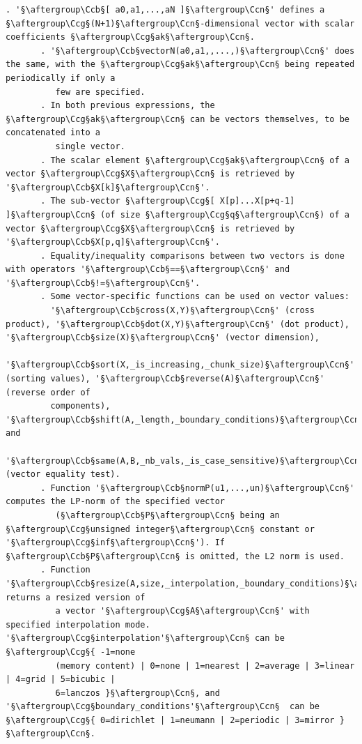 \documentclass[a4paper,10.5pt,twoside]{book}
\def\Ccb{\color{cb}}
\def\Ccg{\color{cc}}
\def\Ccn{\color{black}}
\begin{document}
\begin{lstlisting}[escapechar=§]
       . '§\aftergroup\Ccb§[ a0,a1,...,aN ]§\aftergroup\Ccn§' defines a §\aftergroup\Ccg§(N+1)§\aftergroup\Ccn§-dimensional vector with scalar coefficients §\aftergroup\Ccg§ak§\aftergroup\Ccn§. 
       . '§\aftergroup\Ccb§vectorN(a0,a1,,...,)§\aftergroup\Ccn§' does the same, with the §\aftergroup\Ccg§ak§\aftergroup\Ccn§ being repeated periodically if only a 
          few are specified. 
       . In both previous expressions, the §\aftergroup\Ccg§ak§\aftergroup\Ccn§ can be vectors themselves, to be concatenated into a 
          single vector. 
       . The scalar element §\aftergroup\Ccg§ak§\aftergroup\Ccn§ of a vector §\aftergroup\Ccg§X§\aftergroup\Ccn§ is retrieved by '§\aftergroup\Ccb§X[k]§\aftergroup\Ccn§'. 
       . The sub-vector §\aftergroup\Ccg§[ X[p]...X[p+q-1] ]§\aftergroup\Ccn§ (of size §\aftergroup\Ccg§q§\aftergroup\Ccn§) of a vector §\aftergroup\Ccg§X§\aftergroup\Ccn§ is retrieved by '§\aftergroup\Ccb§X[p,q]§\aftergroup\Ccn§'. 
       . Equality/inequality comparisons between two vectors is done with operators '§\aftergroup\Ccb§==§\aftergroup\Ccn§' and '§\aftergroup\Ccb§!=§\aftergroup\Ccn§'. 
       . Some vector-specific functions can be used on vector values: 
         '§\aftergroup\Ccb§cross(X,Y)§\aftergroup\Ccn§' (cross product), '§\aftergroup\Ccb§dot(X,Y)§\aftergroup\Ccn§' (dot product), '§\aftergroup\Ccb§size(X)§\aftergroup\Ccn§' (vector dimension), 
         '§\aftergroup\Ccb§sort(X,_is_increasing,_chunk_size)§\aftergroup\Ccn§' (sorting values), '§\aftergroup\Ccb§reverse(A)§\aftergroup\Ccn§' (reverse order of 
         components), '§\aftergroup\Ccb§shift(A,_length,_boundary_conditions)§\aftergroup\Ccn§' and 
         '§\aftergroup\Ccb§same(A,B,_nb_vals,_is_case_sensitive)§\aftergroup\Ccn§' (vector equality test). 
       . Function '§\aftergroup\Ccb§normP(u1,...,un)§\aftergroup\Ccn§' computes the LP-norm of the specified vector 
          (§\aftergroup\Ccb§P§\aftergroup\Ccn§ being an §\aftergroup\Ccg§unsigned integer§\aftergroup\Ccn§ constant or '§\aftergroup\Ccg§inf§\aftergroup\Ccn§'). If §\aftergroup\Ccb§P§\aftergroup\Ccn§ is omitted, the L2 norm is used. 
       . Function '§\aftergroup\Ccb§resize(A,size,_interpolation,_boundary_conditions)§\aftergroup\Ccn§' returns a resized version of 
          a vector '§\aftergroup\Ccg§A§\aftergroup\Ccn§' with specified interpolation mode. '§\aftergroup\Ccg§interpolation'§\aftergroup\Ccn§ can be §\aftergroup\Ccg§{ -1=none 
          (memory content) | 0=none | 1=nearest | 2=average | 3=linear | 4=grid | 5=bicubic | 
          6=lanczos }§\aftergroup\Ccn§, and '§\aftergroup\Ccg§boundary_conditions'§\aftergroup\Ccn§  can be §\aftergroup\Ccg§{ 0=dirichlet | 1=neumann | 2=periodic | 3=mirror }§\aftergroup\Ccn§. 

\end{lstlisting}
\end{document}
